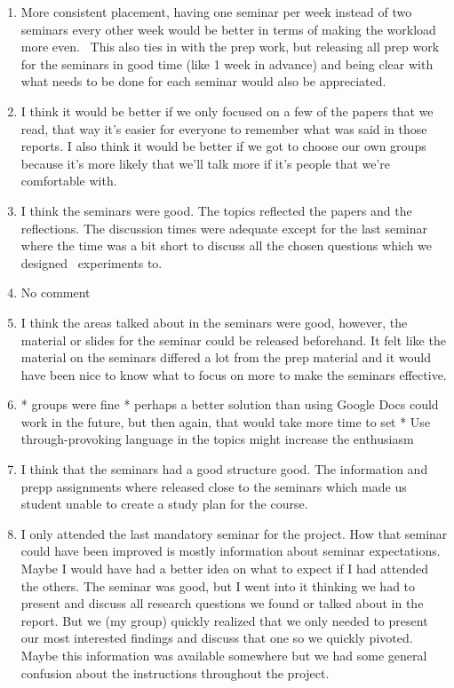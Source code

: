 \documentclass[a4paper]{report}
\begin{document}
\begin{enumerate}
  \item More consistent placement, having one seminar per week instead of two seminars every other week would be better in terms of making the workload more even.   This also ties in with the prep work, but releasing all prep work for the seminars in good time (like 1 week in advance) and being clear with what needs to be done for each seminar would also be appreciated. 
  \item I think it would be better if we only focused on a few of the papers that we read, that way it's easier for everyone to remember what was said in those reports. I also think it would be better if we got to choose our own groups because it's more likely that we'll talk more if it's people that we're comfortable with.
  \item I think the seminars were good. The topics reflected the papers and the reflections. The discussion times were adequate except for the last seminar where the time was a bit short to discuss all the chosen questions which we designed  experiments to. 
  \item No comment 
  \item I think the areas talked about in the seminars were good, however, the material or slides for the seminar could be released beforehand. It felt like the material on the seminars differed a lot from the prep material and it would have been nice to know what to focus on more to make the seminars effective.
  \item * groups were fine  * perhaps a better solution than using Google Docs could work in the future, but then again, that would take more time to set  * Use through-provoking language in the topics might increase the enthusiasm
  \item I think that the seminars had a good structure good. The information and prepp assignments where released close to the seminars which made us student unable to create a study plan for the course. 
  \item I only attended the last mandatory seminar for the project. How that seminar could have been improved is mostly information about seminar expectations. Maybe I would have had a better idea on what to expect if I had attended the others. The seminar was good, but I went into it thinking we had to present and discuss all research questions we found or talked about in the report. But we (my group) quickly realized that we only needed to present our most interested findings and discuss that one so we quickly pivoted. Maybe this information was available somewhere but we had some general confusion about the instructions throughout the project. 

\end{enumerate}
\end{document}
